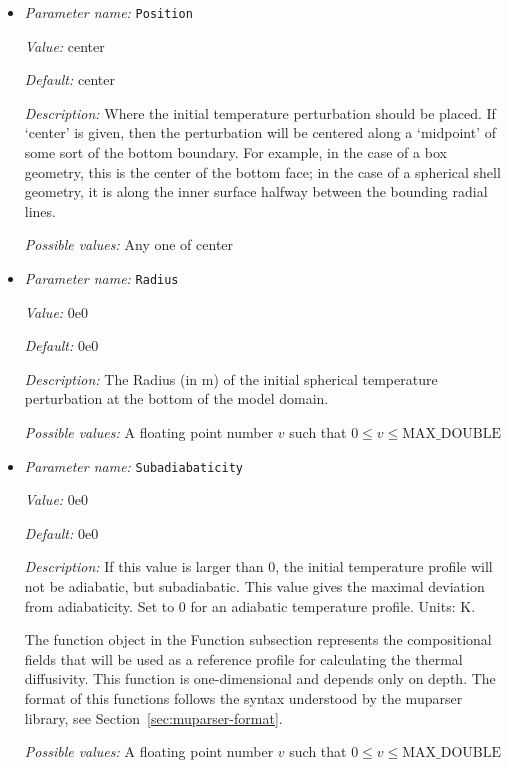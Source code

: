 \begin{itemize}
{\it Possible values:} A floating point number $v$ such that $0 \leq v \leq \text{MAX\_DOUBLE}$
\item {\it Parameter name:} {\tt Position}
\label{parameters:Initial temperature model/Adiabatic/Position}
\label{parameters:Initial_20temperature_20model/Adiabatic/Position}


{\it Value:} center


{\it Default:} center


{\it Description:} Where the initial temperature perturbation should be placed. If `center' is given, then the perturbation will be centered along a `midpoint' of some sort of the bottom boundary. For example, in the case of a box geometry, this is the center of the bottom face; in the case of a spherical shell geometry, it is along the inner surface halfway between the bounding radial lines.


{\it Possible values:} Any one of center
\item {\it Parameter name:} {\tt Radius}
\label{parameters:Initial temperature model/Adiabatic/Radius}
\label{parameters:Initial_20temperature_20model/Adiabatic/Radius}


{\it Value:} 0e0


{\it Default:} 0e0


{\it Description:} The Radius (in m) of the initial spherical temperature perturbation at the bottom of the model domain.


{\it Possible values:} A floating point number $v$ such that $0 \leq v \leq \text{MAX\_DOUBLE}$
\item {\it Parameter name:} {\tt Subadiabaticity}
\label{parameters:Initial temperature model/Adiabatic/Subadiabaticity}
\label{parameters:Initial_20temperature_20model/Adiabatic/Subadiabaticity}


{\it Value:} 0e0


{\it Default:} 0e0


{\it Description:} If this value is larger than 0, the initial temperature profile will not be adiabatic, but subadiabatic. This value gives the maximal deviation from adiabaticity. Set to 0 for an adiabatic temperature profile. Units: K.

The function object in the Function subsection represents the compositional fields that will be used as a reference profile for calculating the thermal diffusivity. This function is one-dimensional and depends only on depth. The format of this functions follows the syntax understood by the muparser library, see Section~\ref{sec:muparser-format}.


{\it Possible values:} A floating point number $v$ such that $0 \leq v \leq \text{MAX\_DOUBLE}$
\end{itemize}



